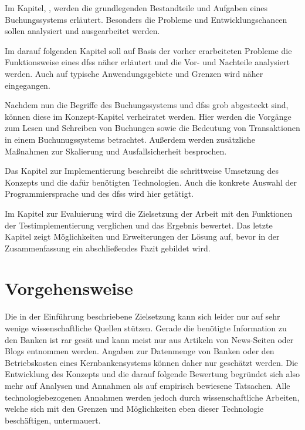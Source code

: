 \documentclass[12pt,oneside,a4paper,parskip]{scrbook}
\begin{document}
Im Kapitel, , werden die grundlegenden Bestandteile und Aufgaben eines Buchungssystems erläutert. Besonders die Probleme und Entwicklungschancen sollen analysiert und ausgearbeitet werden.

Im darauf folgenden Kapitel soll auf Basis der vorher erarbeiteten Probleme die Funktionsweise eines \acp{dfs} näher erläutert und die Vor- und Nachteile analysiert werden. Auch auf typische Anwendungsgebiete und Grenzen wird näher eingegangen.

Nachdem nun die Begriffe des Buchungssystems und \acp{dfs} grob abgesteckt sind, können diese im Konzept-Kapitel verheiratet werden. Hier werden die Vorgänge zum Lesen und Schreiben von Buchungen sowie die Bedeutung von Transaktionen in einem Buchunugssystems betrachtet. Außerdem werden zusätzliche Maßnahmen zur Skalierung und Ausfallsicherheit besprochen.

Das Kapitel zur Implementierung beschreibt die schrittweise Umsetzung des Konzepts und die dafür benötigten Technologien. Auch die konkrete Auswahl der Programmiersprache und des \acp{dfs} wird hier getätigt.

Im Kapitel zur Evaluierung wird die Zielsetzung der Arbeit mit den Funktionen der Testimplementierung verglichen und das Ergebnis bewertet. Das letzte Kapitel zeigt Möglichkeiten und Erweiterungen der Lösung auf, bevor in der Zusammenfassung ein abschließendes Fazit gebildet wird.


\chapter{Vorgehensweise}
Die in der Einführung beschriebene Zielsetzung kann sich leider nur auf sehr wenige wissenschaftliche Quellen stützen. Gerade die benötigte Information zu den Banken ist rar gesät und kann meist nur aus Artikeln von News-Seiten oder Blogs entnommen werden. Angaben zur Datenmenge von Banken oder den Betriebskosten eines Kernbankensystems können daher nur geschätzt werden. Die Entwicklung des Konzepts und die darauf folgende Bewertung begründet sich also mehr auf Analysen und Annahmen als auf empirisch bewiesene Tatsachen. Alle technologiebezogenen Annahmen werden jedoch durch wissenschaftliche Arbeiten, welche sich mit den Grenzen und Möglichkeiten eben dieser Technologie beschäftigen, untermauert.
\end{document}
